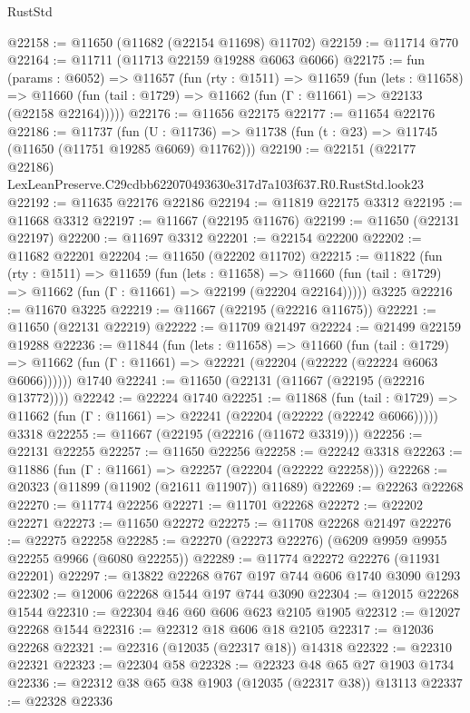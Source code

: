 \begin{lexlean}{RustStd}
\begin{coremodule}
@22158 := @11650 (@11682 (@22154 @11698) @11702)
@22159 := @11714 @770
@22164 := @11711 (@11713 @22159 @19288 @6063 @6066)
@22175 := fun (params : @6052) =>
  @11657
    (fun (rty : @1511) =>
    @11659
      (fun (lets : @11658) =>
      @11660 (fun (tail : @1729) => @11662 (fun (Γ : @11661) => @22133 (@22158 @22164)))))
@22176 := @11656 @22175
@22177 := @11654 @22176
@22186 := @11737
    (fun (U : @11736) => @11738 (fun (t : @23) => @11745 (@11650 (@11751 @19285 @6069) @11762)))
@22190 := @22151 (@22177 @22186) LexLeanPreserve.C29cdbb622070493630e317d7a103f637.R0.RustStd.look23
@22192 := @11635 @22176 @22186
@22194 := @11819 @22175 @3312
@22195 := @11668 @3312
@22197 := @11667 (@22195 @11676)
@22199 := @11650 (@22131 @22197)
@22200 := @11697 @3312
@22201 := @22154 @22200
@22202 := @11682 @22201
@22204 := @11650 (@22202 @11702)
@22215 := @11822
    (fun (rty : @1511) =>
    @11659
      (fun (lets : @11658) =>
      @11660 (fun (tail : @1729) => @11662 (fun (Γ : @11661) => @22199 (@22204 @22164)))))
    @3225
@22216 := @11670 @3225
@22219 := @11667 (@22195 (@22216 @11675))
@22221 := @11650 (@22131 @22219)
@22222 := @11709 @21497
@22224 := @21499 @22159 @19288
@22236 := @11844
    (fun (lets : @11658) =>
    @11660
      (fun (tail : @1729) =>
      @11662 (fun (Γ : @11661) => @22221 (@22204 (@22222 (@22224 @6063 @6066))))))
    @1740
@22241 := @11650 (@22131 (@11667 (@22195 (@22216 @13772))))
@22242 := @22224 @1740
@22251 := @11868
    (fun (tail : @1729) => @11662 (fun (Γ : @11661) => @22241 (@22204 (@22222 (@22242 @6066)))))
    @3318
@22255 := @11667 (@22195 (@22216 (@11672 @3319)))
@22256 := @22131 @22255
@22257 := @11650 @22256
@22258 := @22242 @3318
@22263 := @11886 (fun (Γ : @11661) => @22257 (@22204 (@22222 @22258)))
@22268 := @20323 (@11899 (@11902 (@21611 @11907)) @11689)
@22269 := @22263 @22268
@22270 := @11774 @22256
@22271 := @11701 @22268
@22272 := @22202 @22271
@22273 := @11650 @22272
@22275 := @11708 @22268 @21497
@22276 := @22275 @22258
@22285 := @22270 (@22273 @22276) (@6209 @9959 @9955 @22255 @9966 (@6080 @22255))
@22289 := @11774 @22272 @22276 (@11931 @22201)
@22297 := @13822 @22268 @767 @197 @744 @606 @1740 @3090 @1293
@22302 := @12006 @22268 @1544 @197 @744 @3090
@22304 := @12015 @22268 @1544
@22310 := @22304 @46 @60 @606 @623 @2105 @1905
@22312 := @12027 @22268 @1544
@22316 := @22312 @18 @606 @18 @2105
@22317 := @12036 @22268
@22321 := @22316 (@12035 (@22317 @18)) @14318
@22322 := @22310 @22321
@22323 := @22304 @58
@22328 := @22323 @48 @65 @27 @1903 @1734
@22336 := @22312 @38 @65 @38 @1903 (@12035 (@22317 @38)) @13113
@22337 := @22328 @22336

\end{coremodule}
\end{lexlean}
